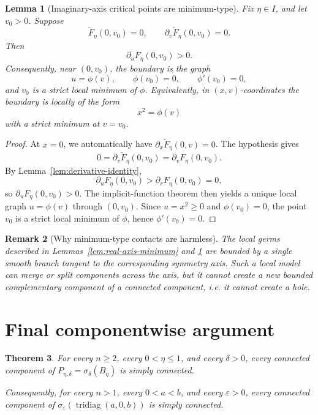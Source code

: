 \documentclass[11pt]{article}
\newtheorem{theorem}{Theorem}[section]
\newtheorem{lemma}[theorem]{Lemma}
\newtheorem{remark}[theorem]{Remark}
\begin{document}
\begin{lemma}[Imaginary-axis critical points are minimum-type]\label{lem:imag-axis-minimum}
Fix \(\eta\in I\), and let \(v_0>0\). Suppose
\[
\widetilde F_\eta(0,v_0)=0,
\qquad
\partial_v\widetilde F_\eta(0,v_0)=0.
\]
Then
\[
\partial_u F_\eta(0,v_0)>0.
\]
Consequently, near \((0,v_0)\), the boundary is the graph
\[
u=\phi(v),
\qquad
\phi(v_0)=0,\qquad \phi'(v_0)=0,
\]
and \(v_0\) is a strict local minimum of \(\phi\). Equivalently, in \((x,v)\)-coordinates the boundary is locally of the form
\[
x^2=\phi(v)
\]
with a strict minimum at \(v=v_0\).
\end{lemma}

\begin{proof}
At \(x=0\), we automatically have \(\partial_x\widetilde F_\eta(0,v)=0\).  The hypothesis gives
\[
0=\partial_v\widetilde F_\eta(0,v_0)=\partial_vF_\eta(0,v_0).
\]
By Lemma~\ref{lem:derivative-identity},
\[
\partial_uF_\eta(0,v_0)
>
\partial_vF_\eta(0,v_0)=0,
\]
so \(\partial_uF_\eta(0,v_0)>0\). The implicit-function theorem then yields a unique local graph \(u=\phi(v)\) through \((0,v_0)\). Since \(u=x^2\ge0\) and \(\phi(v_0)=0\), the point \(v_0\) is a strict local minimum of \(\phi\), hence \(\phi'(v_0)=0\).
\end{proof}

\begin{remark}[Why minimum-type contacts are harmless]
The local germs described in Lemmas~\ref{lem:real-axis-minimum} and \ref{lem:imag-axis-minimum} are bounded by a \emph{single} smooth branch tangent to the corresponding symmetry axis. Such a local model can merge or split components across the axis, but it cannot create a new bounded complementary component of a connected component, i.e. it cannot create a hole.
\end{remark}

\section{Final componentwise argument}

\begin{theorem}\label{thm:main}
For every \(n\ge2\), every \(0<\eta\le1\), and every \(\delta>0\), every connected component of \(P_{\eta,\delta}=\sigma_\delta(B_\eta)\) is simply connected.

Consequently, for every \(n>1\), every \(0<a<b\), and every \(\varepsilon>0\), every connected component of \(\sigma_\varepsilon(\operatorname{tridiag}(a,0,b))\) is simply connected.
\end{theorem}
\end{document}
